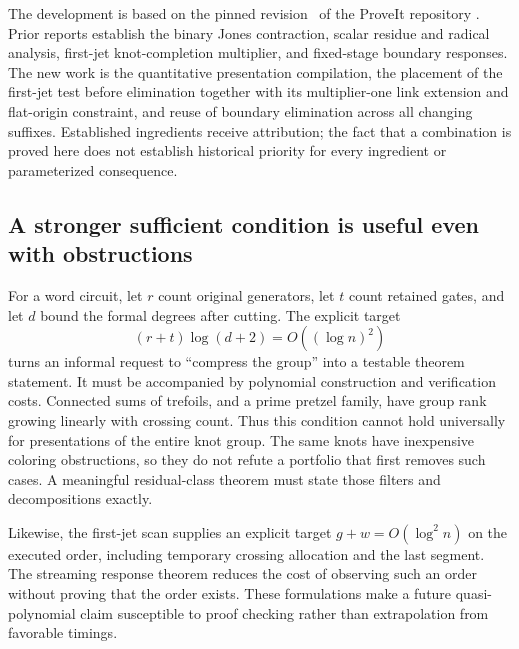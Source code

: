 The development is based on the pinned revision \basecommit\ of the
ProveIt repository \cite{ProveItBaseline}. Prior reports establish the
binary Jones contraction, scalar residue and radical analysis, first-jet
knot-completion multiplier, and fixed-stage boundary responses. The new
work is the quantitative presentation compilation, the placement of the
first-jet test before elimination together with its multiplier-one link
extension and flat-origin constraint, and reuse of boundary elimination
across all changing suffixes. Established ingredients receive attribution;
the fact that a combination is proved here does not establish historical
priority for every ingredient or parameterized consequence.



\subsection{A stronger sufficient condition is useful even with obstructions}

For a word circuit, let $r$ count original generators, let $t$ count
retained gates, and let $d$ bound the formal degrees after cutting. The
explicit target
\[
             (r+t)\log(d+2)=O((\log n)^2)
\]
turns an informal request to ``compress the group'' into a testable theorem
statement. It must be accompanied by polynomial construction and verification
costs. Connected sums of trefoils, and a prime pretzel family, have group
rank growing linearly with crossing count. Thus this condition cannot hold
universally for presentations of the entire knot group. The same knots
have inexpensive coloring obstructions, so they do not refute a portfolio
that first removes such cases. A meaningful residual-class theorem must
state those filters and decompositions exactly.

Likewise, the first-jet scan supplies an explicit target $g+w=O(\log^2 n)$
on the executed order, including temporary crossing allocation and the
last segment. The streaming response theorem reduces the cost of observing
such an order without proving that the order exists. These formulations
make a future quasi-polynomial claim susceptible to proof checking rather
than extrapolation from favorable timings.
